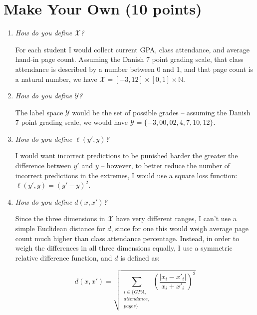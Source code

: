 \section{Make Your Own (10 points)}

\begin{enumerate}

  \item \textit{How do you define $\mathcal X$?}

    For each student I would collect current GPA, class attendance, and
    average hand-in page count. Assuming the Danish 7 point grading scale, that
    class attendance is described by a number between 0 and 1, and that page
    count is a natural number, we have $\mathcal X = [-3, 12] \times [0, 1]
    \times \mathbb N$.



  \item \textit{How do you define $\mathcal Y$?}

    The label space $\mathcal Y$ would be the set of possible grades --
    assuming the Danish 7 point grading scale, we would have $\mathcal Y = \{-3,
    00, 02, 4, 7, 10, 12\}$.

  \item \textit{How do you define $\ell(y', y)$?}

    I would want incorrect predictions to be punished harder the greater the
    difference between $y'$ and $y$ -- however, to better reduce the number of
    incorrect predictions in the extremes, I would use a square loss function:
    $\ell(y', y) = (y' - y)^2$.

  \item \textit{How do you define $d(x, x')$?}


    Since the three dimensions in $\mathcal X$ have very different ranges, I
    can't use a simple Euclidean distance for $d$, since for one this would weigh
    average page count much higher than class attendance percentage. Instead, in
    order to weigh the differences in all three dimensions equally, I use
    a symmetric relative difference function, and $d$ is defined as:

    $$d(x, x') = \sqrt{\sum_{\substack{i \in \{GPA,\\ attendance,\\ pages\}}}
    \left(\frac{|x_i - x'_i|}{x_i + x'_i}\right)^2}$$


\end{enumerate}
